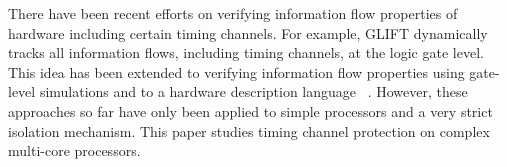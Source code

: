 There have been recent efforts on verifying information flow properties
of hardware including certain timing channels. For example, GLIFT
\cite{glift-asplos09} dynamically tracks all information flows, including timing channels,
at the logic gate level. 
This idea has been extended to verifying
information flow properties using gate-level simulations
\cite{glift-dac10,glift-dac11,glift-isca11} and to a 
hardware description language
~\cite{caisson-plas10,caisson-pldi11,sapper-plas13}.
However, these approaches so far have only been applied to simple
processors and a very strict isolation mechanism. 
This paper studies timing channel protection on complex multi-core processors.

